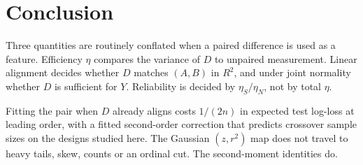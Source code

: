 \section{Conclusion}
\label{sec:conclusion}

Three quantities are routinely conflated when a paired difference is used as a feature.
Efficiency $\eta$ compares the variance of $D$ to unpaired measurement.
Linear alignment decides whether $D$ matches $(A,B)$ in $R^2$, and under joint normality whether $D$ is sufficient for $Y$.
Reliability is decided by $\eta_S/\eta_N$, not by total $\eta$.

Fitting the pair when $D$ already aligns costs $1/(2n)$ in expected test log-loss at leading order, with a fitted second-order correction that predicts crossover sample sizes on the designs studied here.
The Gaussian $(z,r^2)$ map does not travel to heavy tails, skew, counts or an ordinal cut.
The second-moment identities do.
